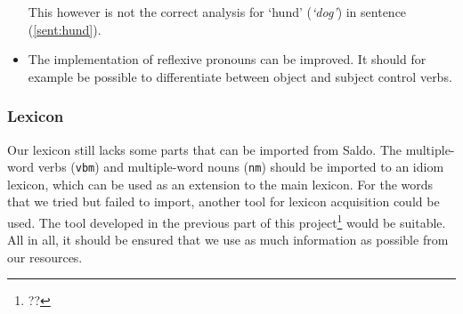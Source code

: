 \documentclass{report}
\begin{document}
\begin{itemize}
This however is not the correct analysis for `hund' (\emph{`dog'}) in sentence (\ref{sent:hund}).
\label{sent:hund}

\item
The implementation of reflexive pronouns can be improved.  %
It should for example be possible to differentiate between 
object and subject control verbs.


%

\end{itemize}
\subsubsection{Lexicon}
Our lexicon still lacks some parts that can be imported from Saldo.
The multiple-word verbs (\verb-vbm-) and multiple-word nouns (\verb-nm-) should
be imported to an idiom lexicon, which can be used as an extension to the main
lexicon.
For the words that we tried but failed to import, another tool for lexicon
acquisition could be used. The tool developed in the previous part of
this project\footnote{??} would be suitable.
All in all, it should be ensured that we use as much information as
possible from our resources.
\end{document}
